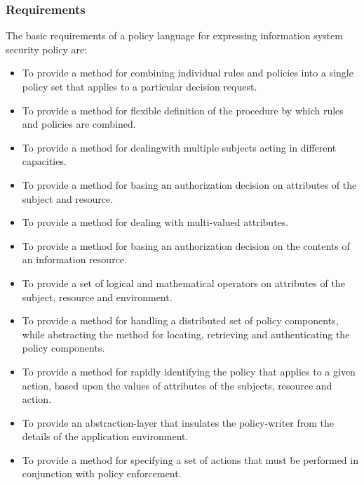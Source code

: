 \subsubsection{Requirements}
\hspace{5mm}The basic requirements of a policy language for expressing information system security policy are:
\begin{itemize}
\item To provide a method for combining individual rules and policies into a single policy set that
applies to a particular decision request.
\item To provide a method for flexible definition of the procedure by which rules and policies are
combined.
\item To provide a method for dealingwith multiple subjects acting in different capacities.
\item To provide a method for basing an authorization decision on attributes of the subject and
resource.
\item To provide a method for dealing with multi-valued attributes.
\item To provide a method for basing an authorization decision on the contents of an information
resource.
\item To provide a set of logical and mathematical operators on attributes of the subject, resource
and environment.
\item To provide a method for handling a distributed set of policy components, while abstracting the
method for locating, retrieving and authenticating the policy components.
\item To provide a method for rapidly identifying the policy that applies to a given action, based upon
the values of attributes of the subjects, resource and action.
\item To provide an abstraction-layer that insulates the policy-writer from the details of the application
environment.
\item To provide a method for specifying a set of actions that must be performed in conjunction with
policy enforcement.
\end{itemize}


